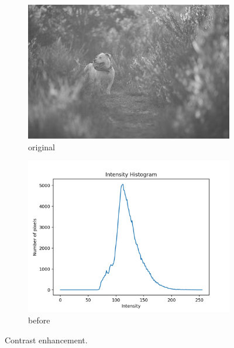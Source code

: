 \documentclass[11pt,a4paper]{article}
\begin{document}
\begin{figure}[h]
	\ContinuedFloat*
	\centering
	\begin{subfigure}[h]{0.7\textwidth}
		\includegraphics[width=\textwidth]{figs/lc1_gray}
		\caption{original}
		\label{fig:lc1_orig}
	\end{subfigure}
	
	\begin{subfigure}[h]{0.75\textwidth}
		\includegraphics[width=\textwidth]{figs/lc1_hist_bef}
		\caption{before}
		\label{fig:hist_bef_1}
	\end{subfigure}
	
	\caption{Contrast enhancement.}
	\label{fig:eq1}
\end{figure}

\clearpage
\end{document}
